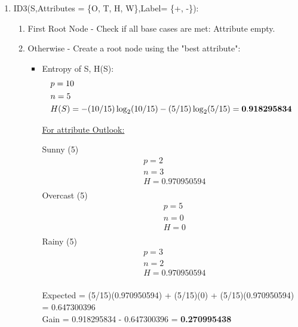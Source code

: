 \documentclass[8pt, fullpage,letterpaper]{article}
\begin{document}
\begin{enumerate}
\begin{enumerate}
\begin{enumerate}
	 	\item ID3(S,Attributes = \{O, T, H, W\},Label= \{+, -\}): 
			\begin{enumerate}
			\item First Root Node - Check if all base cases are met: {\color{teal} Attribute empty}.\\
					{}
			\item Otherwise - Create a root node using the "best attribute":
				\begin{itemize}
					\item Entropy of S, H(S):
						\begin{align*}
						    	& p = 10\\
							& n = 5 \\
						    	& H(S) = - (10/15) \log_2 (10/15) - (5/15) \log_2 (5/15) = {\bf 0.918295834}
					      \end{align*}

						\underline {For attribute Outlook:} 
							\vspace{-5pt}
							\begin{multicols}{3}
								Sunny (5)
			 						\begin{align*}
									    	& p = 2\\
										& n = 3 \\
									    	& H = 0.970950594\\
								      \end{align*}
								Overcast (5)
			 						\begin{align*}
									    	& p = 5\\
										& n = 0 \\
									    	& H = 0\\
								      \end{align*}
								Rainy (5)
			 						\begin{align*}
									    	& p = 3\\
										& n = 2 \\
									    	& H = 0.970950594\\
								      \end{align*}
							\end{multicols}
							\vspace{-20pt}
							Expected = (5/15)(0.970950594) + (5/15)(0) + (5/15)(0.970950594) = 0.647300396\\
							Gain = 0.918295834 - 0.647300396 = {\bf 0.270995438}\\


\end{itemize}
\end{enumerate}
\end{enumerate}
\end{enumerate}
\end{enumerate}
\end{document}
